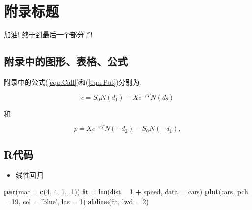 \documentclass[12pt,a4paper,zihao=-4,UTF8]{book}
\newenvironment{Shaded}{\begin{snugshade}}{\end{snugshade}}
\newcommand{\KeywordTok}[1]{\textcolor[rgb]{0.13,0.29,0.53}{\textbf{#1}}}
\newcommand{\DataTypeTok}[1]{\textcolor[rgb]{0.13,0.29,0.53}{#1}}
\newcommand{\DecValTok}[1]{\textcolor[rgb]{0.00,0.00,0.81}{#1}}
\newcommand{\StringTok}[1]{\textcolor[rgb]{0.31,0.60,0.02}{#1}}
\newcommand{\OperatorTok}[1]{\textcolor[rgb]{0.81,0.36,0.00}{\textbf{#1}}}
\newcommand{\NormalTok}[1]{#1}
\providecommand{\tightlist}{%
  \setlength{\itemsep}{0pt}\setlength{\parskip}{0pt}}
\begin{document}
{}
\printbibliography[title={\centerline{\bfseries\sffamily \zihao {-3}参考文献}}]

\begin{appendix}
    \renewcommand{\chaptername}{附录 \Alph{chapter}}
    \renewcommand{\thesection}{\Alph{chapter}.\arabic{section}}
    \renewcommand{\thesubsection}{\Alph{chapter}.\arabic{section}.\arabic{subsection}}
    \renewcommand{\thesubsubsection}{\arabic{subsubsection}.}
    \renewcommand{\thetable}{\Alph{chapter}-\arabic{table}}
    \renewcommand{\theequation}{\Alph{chapter}-\arabic{equation}}
    \renewcommand{\thefigure}{\Alph{chapter}-\arabic{figure}}
\end{appendix}

\chapter{附录标题}

加油! 终于到最后一个部分了!

\section{附录中的图形、表格、公式}

附录中的公式(\ref{equ:Call})和(\ref{equ:Put})分别为:

\begin{equation}\label{equ:Call}
  c=S_0N(d_1)-X e^{-r T}N(d_2)
\end{equation}

和

\begin{equation}\label{equ:Put}
  p=X e^{-r T}N(-d_2)-S_0N(-d_1),
\end{equation}

\section{R代码}

\begin{itemize}
\tightlist
\item
  线性回归
\end{itemize}

\begin{Shaded}
\begin{Highlighting}[]
\KeywordTok{par}\NormalTok{(}\DataTypeTok{mar =} \KeywordTok{c}\NormalTok{(}\DecValTok{4}\NormalTok{, }\DecValTok{4}\NormalTok{, }\DecValTok{1}\NormalTok{, .}\DecValTok{1}\NormalTok{))}
\NormalTok{fit =}\StringTok{ }\KeywordTok{lm}\NormalTok{(dist }\OperatorTok{~}\StringTok{ }\DecValTok{1} \OperatorTok{+}\StringTok{ }\NormalTok{speed, }\DataTypeTok{data =}\NormalTok{ cars)}
\KeywordTok{plot}\NormalTok{(cars, }\DataTypeTok{pch =} \DecValTok{19}\NormalTok{, }\DataTypeTok{col =} \StringTok{'blue'}\NormalTok{, }\DataTypeTok{las =} \DecValTok{1}\NormalTok{)}
\KeywordTok{abline}\NormalTok{(fit, }\DataTypeTok{lwd =} \DecValTok{2}\NormalTok{)}
\end{Highlighting}
\end{Shaded}
\end{document}
